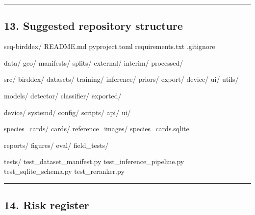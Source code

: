 \documentclass[
  11pt,
]{article}
\newenvironment{Shaded}{}{}
\newcommand{\NormalTok}[1]{#1}
\begin{document}
\begin{center}\rule{0.5\linewidth}{0.5pt}\end{center}

\subsection{13. Suggested repository
structure}\label{suggested-repository-structure}

\begin{Shaded}
\begin{Highlighting}[]
\NormalTok{seq{-}birddex/}
\NormalTok{  README.md}
\NormalTok{  pyproject.toml}
\NormalTok{  requirements.txt}
\NormalTok{  .gitignore}

\NormalTok{  data/}
\NormalTok{    geo/}
\NormalTok{    manifests/}
\NormalTok{    splits/}
\NormalTok{    external/}
\NormalTok{    interim/}
\NormalTok{    processed/}

\NormalTok{  src/}
\NormalTok{    birddex/}
\NormalTok{      datasets/}
\NormalTok{      training/}
\NormalTok{      inference/}
\NormalTok{      priors/}
\NormalTok{      export/}
\NormalTok{      device/}
\NormalTok{      ui/}
\NormalTok{      utils/}

\NormalTok{  models/}
\NormalTok{    detector/}
\NormalTok{    classifier/}
\NormalTok{    exported/}

\NormalTok{  device/}
\NormalTok{    systemd/}
\NormalTok{    config/}
\NormalTok{    scripts/}
\NormalTok{    api/}
\NormalTok{    ui/}

\NormalTok{  species\_cards/}
\NormalTok{    cards/}
\NormalTok{    reference\_images/}
\NormalTok{    species\_cards.sqlite}

\NormalTok{  reports/}
\NormalTok{    figures/}
\NormalTok{    eval/}
\NormalTok{    field\_tests/}

\NormalTok{  tests/}
\NormalTok{    test\_dataset\_manifest.py}
\NormalTok{    test\_inference\_pipeline.py}
\NormalTok{    test\_sqlite\_schema.py}
\NormalTok{    test\_reranker.py}
\end{Highlighting}
\end{Shaded}

\begin{center}\rule{0.5\linewidth}{0.5pt}\end{center}

\subsection{14. Risk register}\label{risk-register}
\end{document}
